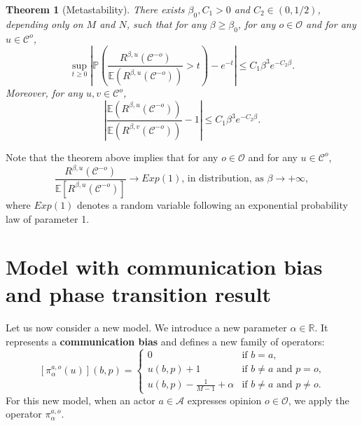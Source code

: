 \documentclass[11pt]{article}
\newtheorem{theorem}{Theorem}
\theoremstyle{definition}
\def\P{{\mathbb P}}
\begin{document}
\begin{theorem}[Metastability]\label{Theorem 3}
There exists $\beta_0, C_1>0$ and  $C_2 \in (0,1/2)$, depending only on $M$ and $N$, such that for any $\beta\geq \beta_0$, for any $o\in\mathcal{O}$ and for any  $u\in \mathcal{C}^o$,
$$
\sup_{t\geq 0}\left|\P\left(\frac{R^{\beta,u}(\mathcal{C}^{-o})}{\mathbb{E}(R^{\beta,u}(\mathcal{C}^{-o}))}>t\right)-e^{-t}\right| \leq C_1\beta^3e^{-C_2 \beta}.
$$
Moreover, for any $u,v \in \mathcal{C}^o$,
$$
\left|\frac{\mathbb{E}(R^{\beta,u}(\mathcal{C}^{-o}))}{\mathbb{E}(R^{\beta,v}(\mathcal{C}^{-o}))}-1\right| \leq C_1\beta^3e^{-C_2 \beta}.
$$
\end{theorem}

Note that the theorem above implies that for any $o\in\mathcal{O}$ and for any $u\in \mathcal{C}^o$,
\[\frac{R^{\beta, u}(\mathcal{C}^{-o})}{\mathbb{E}\left[R^{\beta, u}(\mathcal{C}^{-o}) \right]}\rightarrow Exp(1)\text{, in distribution, as }\beta\rightarrow + \infty, \]
where $Exp(1)$ denotes a random variable following an exponential probability law of parameter 1.

\section{Model with communication bias and phase transition result} \label{sec:communicationbias}
Let us now consider a new model.
We introduce a new parameter $\alpha\in\mathbb{R}$. It represents a \textbf{communication bias} and defines a new family of operators:
\begin{equation}\label{biasmap}
    [\pi_\alpha^{a,o}(u)](b,p)=
    \begin{cases}
        0 & \text{if $b = a$,} \\
        u(b,p) + 1 & \text{if $b\neq a$ and $p=o$,} \\
        u(b,p) - \frac{1}{M-1}+\alpha & \text{if $b\neq a$ and $p\neq o$.}
    \end{cases}
\end{equation}
For this new model, when an actor $a\in\mathcal{A}$ expresses opinion $o\in\mathcal{O}$, we apply the operator $\pi_\alpha^{a,o}$.
\end{document}
